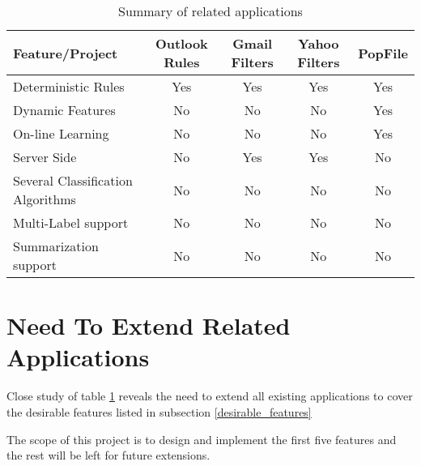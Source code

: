 \begin{center}
  \begin{table}[H]
    \begin{tabular}{ | p{3cm} | c | c | c | c |}
      \hline
      Feature/Project              & Outlook Rules \cite{OUTLOOK_REF} & Gmail Filters \cite{GMAIL_FILTERS} & 
                        Yahoo Filters \cite{YAHOO_FILTERS} & PopFile \cite{POPFILE} \\ \hline
      Deterministic Rules \cite{YAHOO_FILTERS} \cite{GMAIL_FILTERS}  &    Yes        &    Yes        &    Yes      &    Yes  \\ \hline     
      Dynamic Features  \cite{Sebastiani2002} \cite{RON04} &    No        &    No         &    No        &    Yes  \\ \hline
      On-line Learning \cite{JOSE11} &    No        &    No         &    No        &    Yes  \\ \hline
      Server Side      &    No        &    Yes        &    Yes       &    No   \\ \hline
      Several Classification Algorithms \cite{Sebastiani2002} &    No        &    No &    No       &    No   \\ \hline
      Multi-Label support  \cite{sift02} \cite{Carmona2011} &    No        &    No &    No       &    No   \\ \hline
      Summarization support&    No        &    No &    No       &    No   \\ \hline
    \end{tabular}
    \caption[Summary of related work]{Summary of related applications}
    \label{related_applications_summary}
  \end{table}
\end{center}  


\section{Need To Extend Related Applications}
\label{sec:need_to_extend}
Close study of table \ref{related_applications_summary} reveals the need to extend all existing applications to cover the desirable features listed in subsection \ref{desirable_features}

The scope of this project is to design and implement the first five features and the rest will be left for future extensions.

